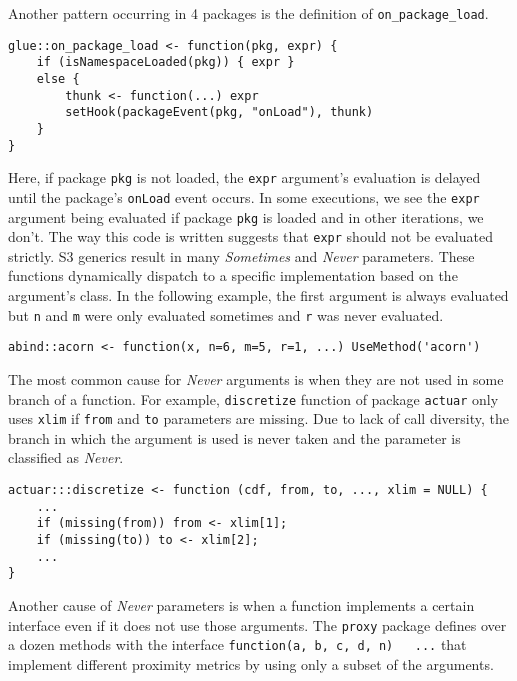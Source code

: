 \documentclass[review,nonacm,screen,acmsmall,anonymous=true]{acmart}
\newcommand{\sometimes}{\emph{Sometimes}\xspace}
\newcommand{\never}{\emph{Never}\xspace}
\newcommand{\code}[1]{\lstinline |#1|\xspace}
\begin{document}
Another pattern occurring in 4 packages is the definition of
\code{on_package_load}.

\begin{lstlisting}
glue::on_package_load <- function(pkg, expr) {
    if (isNamespaceLoaded(pkg)) { expr }
    else {
        thunk <- function(...) expr
        setHook(packageEvent(pkg, "onLoad"), thunk)
    }
}
\end{lstlisting}
%
Here, if package \code{pkg} is not loaded, the \code{expr} argument's evaluation
is delayed until the package's \code{onLoad} event occurs. In some executions,
we see the \code{expr} argument being evaluated if package \code{pkg} is loaded
and in other iterations, we don't. The way this code is written suggests that
\code{expr} should not be evaluated strictly.
%
S3 generics result in many \sometimes and \never parameters. These functions
dynamically dispatch to a specific implementation based on the argument's class.
In the following example, the first argument is always evaluated but \code{n}
and \code{m} were only evaluated sometimes and \code{r} was never evaluated.
%
\begin{lstlisting}
abind::acorn <- function(x, n=6, m=5, r=1, ...) UseMethod('acorn')
\end{lstlisting}


The most common cause for \never arguments is when they are not used in some
branch of a function. For example, \code{discretize} function of package
\code{actuar} only uses \code{xlim} if \code{from} and \code{to} parameters are
missing. Due to lack of call diversity, the branch in which the argument is used
is never taken and the parameter is classified as \never.
\begin{lstlisting}
actuar:::discretize <- function (cdf, from, to, ..., xlim = NULL) {
    ...
    if (missing(from)) from <- xlim[1];
    if (missing(to)) to <- xlim[2];
    ...
}
\end{lstlisting}
%
Another cause of \never parameters is when a function implements a certain
interface even if it does not use those arguments. The \code{proxy} package
defines over a dozen methods with the interface \code{function(a, b, c, d, n)
  ...} that implement different proximity metrics by using only a subset of the
arguments.
\end{document}
